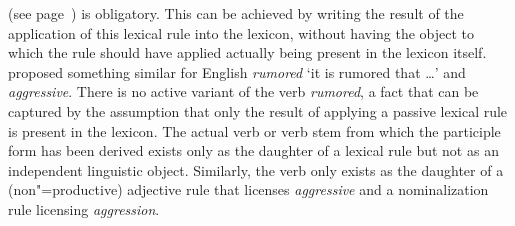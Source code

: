 \begin{exe}
\begin{xlist}[iv.]
\begin{exe}
\begin{xlist}[iv.]
(see page~\pageref{lr-verb-movement}) is obligatory. This can be achieved by writing the result of the application of this lexical rule into the lexicon, without
having the object to which the rule should have applied actually being present in the lexicon itself. 
\citet[Section~3.4.2, 5.3]{Koenig99a} proposed something similar for English \emph{rumored} `it is rumored that \ldots' and \emph{aggressive}. 
There is no active variant of the verb \emph{rumored}, a fact that can be captured by the assumption that only the result of applying a passive lexical rule
is present in the lexicon. The actual verb or verb stem from which the participle form has been
derived exists only as the daughter of a lexical rule but not as an independent linguistic
object. Similarly, the verb  only exists as the daughter of a (non"=productive)
adjective rule that licenses \emph{aggressive} and a nominalization rule licensing \emph{aggression}.


\end{xlist}
\end{exe}
\end{xlist}
\end{exe}
